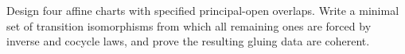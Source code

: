 \begin{problem}\label{chal:vi20-01}
Design four affine charts with specified principal-open overlaps.  Write a minimal set of transition isomorphisms from which all remaining ones are forced by inverse and cocycle laws, and prove the resulting gluing data are coherent.
\end{problem}
